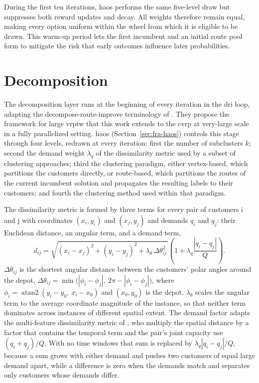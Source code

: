 During the first ten iterations, \gls{haos} performs the same five-level draw but suppresses both reward updates and decay. All weights therefore remain equal, making every option uniform within the wheel from which it is eligible to be drawn. This warm-up period lets the first incumbent and an initial route pool form to mitigate the risk that early outcomes influence later probabilities.

\section{Decomposition}\label{sec:fra-decomposition}
The decomposition layer runs at the beginning of every iteration in the \gls{dri} loop, adapting the decompose-route-improve terminology of \citet{kerscherDecomposerouteimproveFrameworkSolving2025}. They propose the framework for large \gls{vrptw} that this work extends to the \gls{cvrp} at very-large scale in a fully parallelized setting. \gls{haos} (Section~\ref{sec:fra-haos}) controls this stage through four levels, redrawn at every iteration: first the number of subclusters $k$; second the demand weight $\lambda_q$ of the dissimilarity metric used by a subset of clustering approaches; third the clustering paradigm, either vertex-based, which partitions the customers directly, or route-based, which partitions the routes of the current incumbent solution and propagates the resulting labels to their customers; and fourth the clustering method used within that paradigm.

The dissimilarity metric is formed by three terms for every pair of customers i and j with coordinates $(x_i, y_i)$ and $(x_j, y_j)$ and demands $q_i$ and $q_j$: their Euclidean distance, an angular term, and a demand term,
\begin{equation}
d_{ij} = \sqrt{(x_i - x_j)^2 + (y_i - y_j)^2 + \lambda_\theta \, \Delta\theta_{ij}^2\,} \left(1 + \lambda_q \frac{|q_i - q_j|}{Q}\right).
\label{eq:decomp-dissimilarity}
\end{equation}
$\Delta\theta_{ij}$ is the shortest angular distance between the customers' polar angles around the depot,
$\Delta\theta_{ij} = \min\bigl(|\phi_i - \phi_j|,\ 2\pi - |\phi_i - \phi_j|\bigr)$,
where $\phi_i = \operatorname{atan2}(y_i - y_0,\ x_i - x_0)$ and $(x_0, y_0)$ is the depot. $\lambda_\theta$ scales the angular term to the average coordinate magnitude of the instance, so that neither term dominates across instances of different spatial extent. The demand factor adapts the multi-feature dissimilarity metric of \citet{kerscherDecomposerouteimproveFrameworkSolving2025}, who multiply the spatial distance by a factor that contains the temporal term and the pair's joint capacity use $(q_i + q_j)/Q$. With no time windows that sum is replaced by $\lambda_q |q_i - q_j|/Q$, because a sum grows with either demand and pushes two customers of equal large demand apart, while a difference is zero when the demands match and separates only customers whose demands differ.

